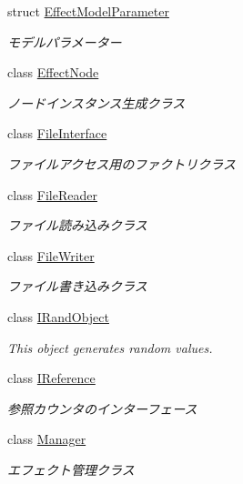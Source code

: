 \begin{DoxyCompactItemize}
struct \mbox{\hyperlink{struct_effekseer_1_1_effect_model_parameter}{Effect\+Model\+Parameter}}
\begin{DoxyCompactList}\small\item\em モデルパラメーター \end{DoxyCompactList}\item 
class \mbox{\hyperlink{class_effekseer_1_1_effect_node}{Effect\+Node}}
\begin{DoxyCompactList}\small\item\em ノードインスタンス生成クラス \end{DoxyCompactList}\item 
class \mbox{\hyperlink{class_effekseer_1_1_file_interface}{File\+Interface}}
\begin{DoxyCompactList}\small\item\em ファイルアクセス用のファクトリクラス \end{DoxyCompactList}\item 
class \mbox{\hyperlink{class_effekseer_1_1_file_reader}{File\+Reader}}
\begin{DoxyCompactList}\small\item\em ファイル読み込みクラス \end{DoxyCompactList}\item 
class \mbox{\hyperlink{class_effekseer_1_1_file_writer}{File\+Writer}}
\begin{DoxyCompactList}\small\item\em ファイル書き込みクラス \end{DoxyCompactList}\item 
class \mbox{\hyperlink{class_effekseer_1_1_i_rand_object}{I\+Rand\+Object}}
\begin{DoxyCompactList}\small\item\em This object generates random values. \end{DoxyCompactList}\item 
class \mbox{\hyperlink{class_effekseer_1_1_i_reference}{I\+Reference}}
\begin{DoxyCompactList}\small\item\em 参照カウンタのインターフェース \end{DoxyCompactList}\item 
class \mbox{\hyperlink{class_effekseer_1_1_manager}{Manager}}
\begin{DoxyCompactList}\small\item\em エフェクト管理クラス \end{DoxyCompactList}\item 

\end{DoxyCompactItemize}
